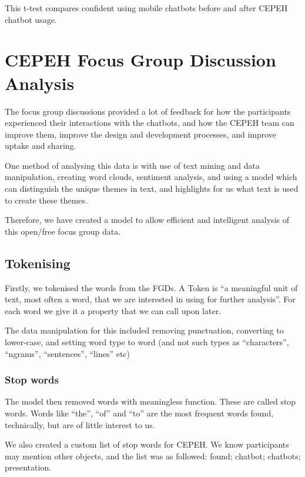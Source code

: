 \documentclass[a4paper, nobind]{templates/ociamthesis}
\begin{document}
This t-test compares confident using mobile chatbots before and after
CEPEH chatbot usage.

\hypertarget{cepeh-focus-group-discussion-analysis}{%
\chapter{CEPEH Focus Group Discussion Analysis}\label{cepeh-focus-group-discussion-analysis}}

The focus group discussions provided a lot of feedback for how the
participants experienced their interactions with the chatbots, and how
the CEPEH team can improve them, improve the design and development
processes, and improve uptake and sharing.

One method of analysing this data is with use of text mining and data
manipulation, creating word clouds, sentiment analysis, and using a
model which can distinguish the unique themes in text, and highlights
for us what text is used to create these themes.

Therefore, we have created a model to allow efficient and intelligent
analysis of this open/free focus group data.

\hypertarget{tokenising}{%
\section{Tokenising}\label{tokenising}}

Firstly, we tokenised the words from the FGDs. A Token is ``a meaningful
unit of text, most often a word, that we are interested in using for
further analysis''. For each word we give it a property that we can call
upon later.

The data manipulation for this included removing punctuation, converting
to lower-case, and setting word type to word (and not such types as
``characters'', ``ngrams'', ``sentences'', ``lines'' etc)

\hypertarget{stop-words}{%
\subsection{Stop words}\label{stop-words}}

The model then removed words with meaningless function. These are called
stop words. Words like ``the'', ``of'' and ``to'' are the most frequent words
found, technically, but are of little interest to us.

We also created a custom list of stop words for CEPEH. We know
participants may mention other objects, and the list was as followed:
found; chatbot; chatbots; presentation.
\end{document}
